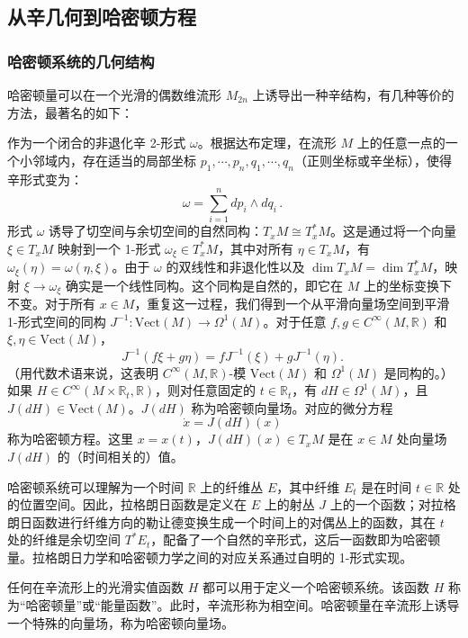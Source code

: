 \subsection{从辛几何到哈密顿方程}
\subsubsection{哈密顿系统的几何结构}
哈密顿量可以在一个光滑的偶数维流形 \( M_{2n} \) 上诱导出一种辛结构，有几种等价的方法，最著名的如下：

作为一个闭合的非退化辛 2-形式 \( \omega \)。根据达布定理，在流形 \( M \) 上的任意一点的一个小邻域内，存在适当的局部坐标 \( p_{1}, \cdots, p_{n}, q_{1}, \cdots, q_{n} \)（正则坐标或辛坐标），使得辛形式变为：
\[
\omega = \sum_{i=1}^{n} dp_{i} \wedge dq_{i} \,.~
\]
形式 \( \omega \) 诱导了切空间与余切空间的自然同构：\( T_x M \cong T_x^* M \)。这是通过将一个向量 \( \xi \in T_x M \) 映射到一个 1-形式 \( \omega_\xi \in T_x^* M \)，其中对所有 \( \eta \in T_x M \)，有 \( \omega_\xi(\eta) = \omega(\eta, \xi) \)。由于 \( \omega \) 的双线性和非退化性以及 \( \dim T_x M = \dim T_x^* M \)，映射 \( \xi \to \omega_\xi \) 确实是一个线性同构。这个同构是自然的，即它在 \( M \) 上的坐标变换下不变。对于所有 \( x \in M \)，重复这一过程，我们得到一个从平滑向量场空间到平滑 1-形式空间的同构 \( J^{-1}: \text{Vect}(M) \to \Omega^1(M) \)。对于任意 \( f, g \in C^{\infty}(M, \mathbb{R}) \) 和 \( \xi, \eta \in \text{Vect}(M) \)，
\[
J^{-1}(f \xi + g \eta) = f J^{-1}(\xi) + g J^{-1}(\eta).~
\]
（用代数术语来说，这表明 \( C^{\infty}(M, \mathbb{R}) \)-模 \( \text{Vect}(M) \) 和 \( \Omega^1(M) \) 是同构的。）如果 \( H \in C^{\infty}(M \times \mathbb{R}_t, \mathbb{R}) \)，则对任意固定的 \( t \in \mathbb{R}_t \)，有 \( dH \in \Omega^1(M) \)，且 \( J(dH) \in \text{Vect}(M) \)。\( J(dH) \) 称为哈密顿向量场。对应的微分方程
\[
\dot{x} = J(dH)(x)~
\]
称为哈密顿方程。这里 \( x = x(t) \)，\( J(dH)(x) \in T_x M \) 是在 \( x \in M \) 处向量场 \( J(dH) \) 的（时间相关的）值。

哈密顿系统可以理解为一个时间 \( \mathbb{R} \) 上的纤维丛 \( E \)，其中纤维 \( E_t \) 是在时间 \( t \in \mathbb{R} \) 处的位置空间。因此，拉格朗日函数是定义在 \( E \) 上的射丛 \( J \) 上的一个函数；对拉格朗日函数进行纤维方向的勒让德变换生成一个时间上的对偶丛上的函数，其在 \( t \) 处的纤维是余切空间 \( T^* E_t \)，配备了一个自然的辛形式，这后一函数即为哈密顿量。拉格朗日力学和哈密顿力学之间的对应关系通过自明的 1-形式实现。

任何在辛流形上的光滑实值函数 \( H \) 都可以用于定义一个哈密顿系统。该函数 \( H \) 称为“哈密顿量”或“能量函数”。此时，辛流形称为相空间。哈密顿量在辛流形上诱导一个特殊的向量场，称为哈密顿向量场。

